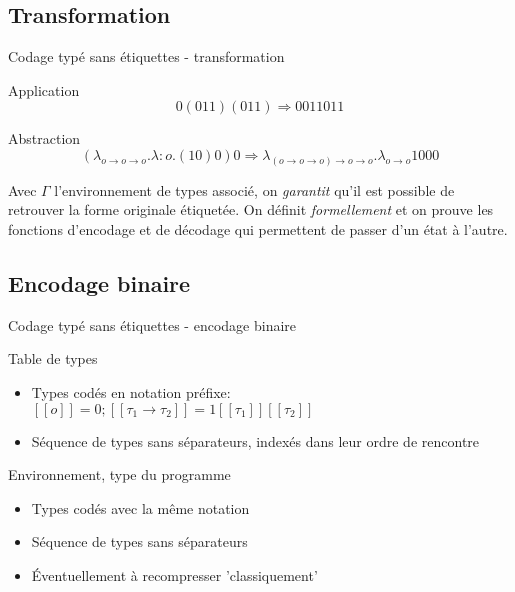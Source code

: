 \documentclass{beamer}
\begin{document}
\subsection{Transformation}
\begin{frame}{Codage typé sans étiquettes - transformation}
  \begin{block}{Application}
    $$0(011)(011) \Rightarrow 0011011$$
  \end{block}
  \begin{block}{Abstraction}
    $$(\lambda_{o \rightarrow o \rightarrow o}.\lambda:o.(10)0)0 \Rightarrow \lambda_{(o \rightarrow o \rightarrow o) \rightarrow o \rightarrow o}.\lambda_{o \rightarrow o} 1 0 0 0$$
  \end{block}
  \pause
  Avec $\Gamma$ l'environnement de types associé, on \emph{garantit} qu'il est possible de retrouver
  la forme originale étiquetée. On définit \emph{formellement} et on prouve les fonctions
  d'encodage et de décodage qui permettent de passer d'un état à l'autre.
\end{frame}

\subsection{Encodage binaire}
\begin{frame}{Codage typé sans étiquettes - encodage binaire}
\begin{block}{Table de types}
\begin{itemize}
\item Types codés en notation préfixe: $[\![o]\!] = 0; [\![\tau_1 \rightarrow \tau_2]\!] = 1[\![\tau_1]\!][\![\tau_2]\!]$

    \item Séquence de types sans séparateurs, indexés dans leur ordre de rencontre
\end{itemize}
\end{block}
\pause
\begin{block}{Environnement, type du programme}
\begin{itemize}
    \item Types codés avec la même  notation
    \item Séquence de types sans séparateurs
    \item Éventuellement à recompresser 'classiquement'
\end{itemize}
\end{block}
\end{frame}
\end{document}
